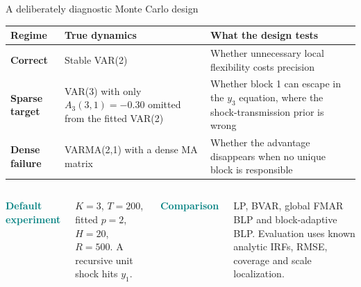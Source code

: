 \documentclass[aspectratio=169,11pt]{beamer}
\newcommand{\keypoint}[1]{\textcolor{Teal}{\textbf{#1}}}
\begin{document}
\begin{frame}{A deliberately diagnostic Monte Carlo design}
  \vspace{-1mm}
  {\fontsize{13.7}{17}\selectfont
  \renewcommand{\arraystretch}{1.38}
  \begin{tabularx}{\textwidth}{>{\bfseries}p{} p{} X}
    \toprule
    Regime & True dynamics & What the design tests \\
    \midrule
    Correct & Stable VAR(2) & Whether unnecessary local flexibility costs precision \\
    \rowcolor{PaleTeal}
    Sparse target & VAR(3) with only $A_3(3,1)=-0.30$ omitted from the fitted VAR(2) & Whether block 1 can escape in the $y_3$ equation, where the shock-transmission prior is wrong \\
    Dense failure & VARMA(2,1) with a dense MA matrix & Whether the advantage disappears when no unique block is responsible \\
    \bottomrule
  \end{tabularx}}

  \vspace{5mm}
  \begin{columns}[T,onlytextwidth]
      {\fontsize{14.2}{18}\selectfont
      \keypoint{Default experiment}\par
      $K=3$, $T=200$, fitted $p=2$, $H=20$, $R=500$.
      A recursive unit shock hits $y_1$.}
      {\fontsize{14.2}{18}\selectfont
      \keypoint{Comparison}\par
      LP, BVAR, global FMAR BLP and block-adaptive BLP. Evaluation uses
      known analytic IRFs, RMSE, coverage and scale localization.}
  \end{columns}
\end{frame}
\end{document}
